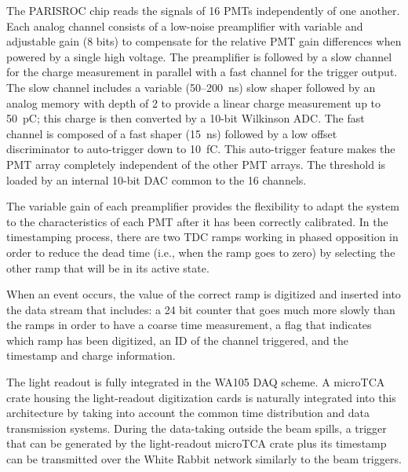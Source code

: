 The PARISROC chip reads the signals of 16 PMTs
independently of one another. Each analog channel consists of a
low-noise preamplifier with variable and adjustable gain (8 bits) to
compensate for the relative PMT gain differences when
powered by a single high voltage. The preamplifier is followed by a
slow channel for the charge measurement in parallel with a fast
channel for the trigger output. The slow channel includes a variable
(50--200~ns) slow shaper followed by an analog memory with depth of 2
to provide a linear charge measurement up to 50~pC; this charge is
then converted by a 10-bit Wilkinson ADC. The fast channel is composed
of a fast shaper (15~ns) followed by a low offset discriminator to
auto-trigger down to 10~fC. This auto-trigger feature makes the PMT
array completely independent of the other PMT arrays. The
threshold is loaded by an internal 10-bit DAC common to the 16
channels.


The variable gain of each preamplifier provides the flexibility to
adapt the system to the characteristics of each PMT after
it has been correctly calibrated. In the timestamping process, there
are two TDC ramps working in phased opposition in order to reduce the
dead time (i.e., when the ramp goes to zero) by selecting the other ramp
that will be in its active state.

When an event occurs, the value of the correct ramp is digitized and
inserted into the data stream that includes: a 24 bit counter that
goes much more slowly than the ramps in order to have a coarse time
measurement, a flag that indicates which ramp has been digitized, an
ID of the channel triggered, and the timestamp and charge information.


The light readout is fully integrated in the WA105 DAQ scheme. A
microTCA crate housing the light-readout digitization cards is
naturally integrated into this architecture by taking into account the
common time distribution and data transmission systems.  During the
data-taking outside the beam spills, a trigger that can be generated
by the light-readout microTCA crate plus its timestamp can be
transmitted over the White Rabbit network similarly to the beam
triggers.

